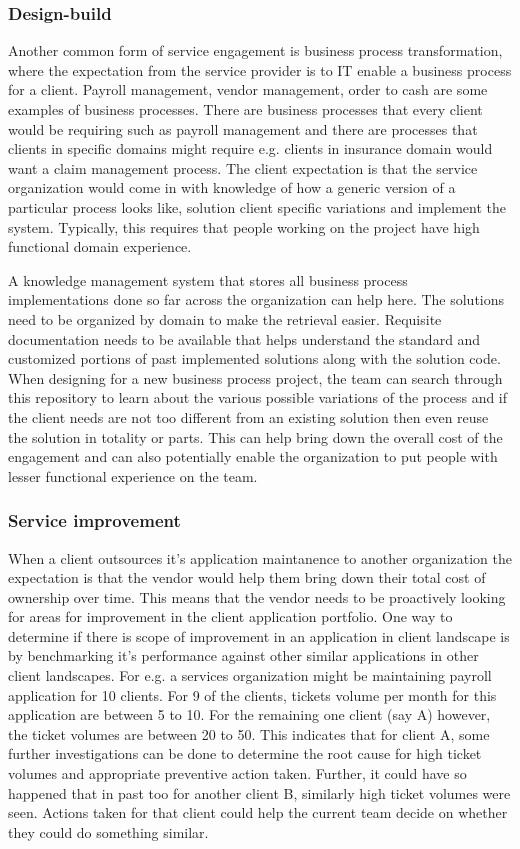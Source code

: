 \subsubsection{Design-build}

Another common form of service engagement is business process transformation, where the expectation from the service provider is to IT enable a business process for a client. Payroll management, vendor management, order to cash are some examples of business processes. There are business processes that every client would be requiring such as payroll management and there are processes that clients in specific domains might require e.g. clients in insurance domain would want a claim management process. The client expectation is that the service organization would come in with knowledge of how a generic version of a particular process looks like, solution client specific variations and implement the system. Typically, this requires that people working on the project have high functional domain experience. 

A knowledge management system that stores all business process implementations done so far across the organization can help here. The solutions need to be organized by domain to make the retrieval easier. Requisite documentation needs to be available that helps understand the standard and customized portions of past implemented solutions along with the solution code. When designing for a new business process project, the team can search through this repository to learn about the various possible variations of the process and if the client needs are not too different from an existing solution then even reuse the solution in totality or parts. This can help bring down the overall cost of the engagement and can also potentially enable the organization to put people with lesser functional experience on the team. 

\subsubsection{Service improvement}

When a client outsources it's application maintanence to another organization the expectation is that the vendor would help them bring down their total cost of ownership over time. This means that the vendor needs to be proactively looking for areas for improvement in the client application portfolio. One way to determine if there is scope of improvement in an application in client landscape is by benchmarking it's performance against other similar applications in other client landscapes. For e.g. a services organization might be maintaining payroll application for 10 clients. For 9 of the clients, tickets volume per month for this application are between 5 to 10. For the remaining one client (say A) however, the ticket volumes are between 20 to 50. This indicates that for client A, some further investigations can be done to determine the root cause for high ticket volumes and appropriate preventive action taken. Further, it could have so happened that in past too for another client B, similarly high ticket volumes were seen. Actions taken for that client could help the current team decide on whether they could do something similar.


